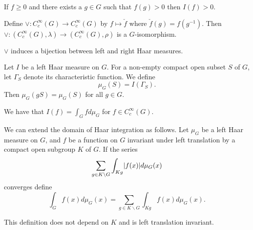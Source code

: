 \documentclass{memoir}
\begin{document}
\begin{remark}
    If $f\ge0$ and there exists a $g\in G$ such that $f(g)>0$ then $I(f)>0$.
\end{remark}
\begin{definition}
    Define $\vee:C_c^\infty(G)\to C_c^\infty(G)$ by $f\mapsto \check f$ where $\check f(g) = f(g^{-1})$.
    Then $\vee:(C_c^\infty(G),\lambda)\to (C_c^\infty(G),\rho)$ is a $G$-isomorphism.
\end{definition}
\begin{remark}
    $\vee$ induces a bijection between left and right Haar measures.
\end{remark}
\begin{definition}
    Let $I$ be a left Haar measure on $G$.
    For a non-empty compact open subset $S$ of $G$, let $\Gamma_S$ denote its characteristic function.
    We define 
    \begin{equation}
        \mu_G(S) = I(\Gamma_S).
    \end{equation}
    Then $\mu_G(gS) = \mu_G(S)$ for all $g\in G$.
\end{definition}
\begin{remark}
    We have that $I(f) = \int_Gfd\mu_G$ for $f\in C_c^\infty(G)$.
\end{remark}
\begin{definition}
    We can extend the domain of Haar integration as follows.
    Let $\mu_G$ be a left Haar measure on $G$, and $f$ be a function on $G$ invariant under left translation by a compact open subgroup $K$ of $G$.
    If the series 
    \begin{equation}
        \sum_{g\in K\backslash G}\int_{Kg}\lvert f(x)\rvert d\mu_G(x)
    \end{equation}
    converges define
    \begin{equation}
        \int_Gf(x)d\mu_G(x) = \sum_{g\in K\backslash G}\int_{Kg}f(x)d\mu_G(x).
    \end{equation}
\end{definition}
\begin{proposition}
    This definition does not depend on $K$ and is left translation invariant.
\end{proposition}
\end{document}
